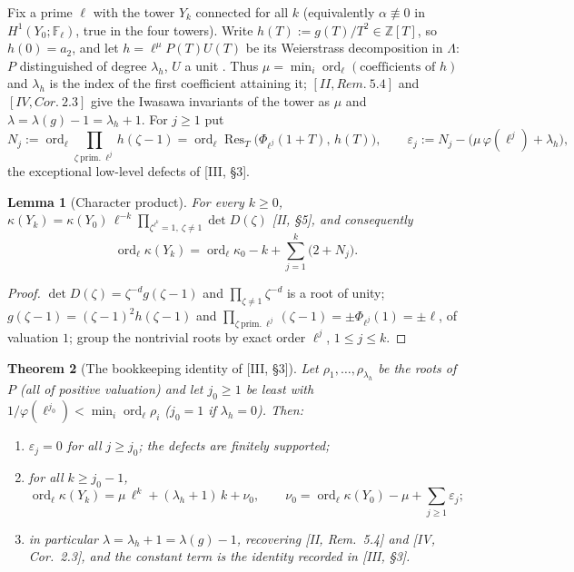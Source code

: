 \documentclass[11pt]{amsart}
\numberwithin{equation}{section}
\newtheorem{theorem}{Theorem}[section]
\newtheorem{lemma}[theorem]{Lemma}
\theoremstyle{definition}
\theoremstyle{remark}
\newcommand{\Z}{\mathbb{Z}}
\newcommand{\F}{\mathbb{F}}
\newcommand{\La}{\Lambda}
\newcommand{\ord}{\operatorname{ord}}
\newcommand{\Res}{\operatorname{Res}}
\begin{document}
Fix a prime $\ell$ with the tower $Y_k$ connected for all $k$ (equivalently
$\alpha\not\equiv0$ in $H^{1}(Y_0;\F_\ell)$, true in the four towers). Write
$h(T):=g(T)/T^{2}\in\Z[T]$, so $h(0)=a_2$, and let $h=\ell^{\mu}P(T)U(T)$ be its
Weierstrass decomposition in $\La$: $P$ distinguished of degree $\lambda_h$, $U$ a unit
\cite{Wa}. Thus $\mu=\min_i\ord_\ell(\text{coefficients of }h)$ and $\lambda_h$ is the
index of the first coefficient attaining it; $[II, Rem.~5.4]$ and $[IV, Cor.~2.3]$ give
the Iwasawa invariants of the tower as $\mu$ and $\lambda=\lambda(g)-1=\lambda_h+1$.
For $j\ge1$ put
\[
N_j:=\ord_\ell\prod_{\zeta\ \mathrm{prim.}\ \ell^{j}}h(\zeta-1)
=\ord_\ell\Res_T\bigl(\Phi_{\ell^{j}}(1+T),\,h(T)\bigr),
\qquad
\varepsilon_j:=N_j-\bigl(\mu\,\varphi(\ell^{j})+\lambda_h\bigr),
\]
the exceptional low-level defects of [III, \S3].

\begin{lemma}[Character product]\label{lem:char}
For every $k\ge0$,
$\kappa(Y_k)=\kappa(Y_0)\,\ell^{-k}\prod_{\zeta^{\ell^{k}}=1,\ \zeta\neq1}\det D(\zeta)$
{\rm[II, \S5]}, and consequently
\[
\ord_\ell\kappa(Y_k)=\ord_\ell\kappa_0-k+\sum_{j=1}^{k}\bigl(2+N_j\bigr).
\]
\end{lemma}

\begin{proof}
$\det D(\zeta)=\zeta^{-d}g(\zeta-1)$ and $\prod_{\zeta\neq1}\zeta^{-d}$ is a root of
unity; $g(\zeta-1)=(\zeta-1)^{2}h(\zeta-1)$ and
$\prod_{\zeta\ \mathrm{prim.}\ \ell^{j}}(\zeta-1)=\pm\Phi_{\ell^{j}}(1)=\pm\ell$, of
valuation $1$; group the nontrivial roots by exact order $\ell^{j}$, $1\le j\le k$.
\end{proof}

\begin{theorem}[The bookkeeping identity of {\rm[III, \S3]}]\label{thm:book}
Let $\rho_1,\dots,\rho_{\lambda_h}$ be the roots of $P$ (all of positive valuation) and
let $j_0\ge1$ be least with $1/\varphi(\ell^{j_0})<\min_i\ord_\ell\rho_i$ ($j_0=1$ if
$\lambda_h=0$). Then:
\begin{enumerate}
\item[(i)] $\varepsilon_j=0$ for all $j\ge j_0$; the defects are finitely supported;
\item[(ii)] for all $k\ge j_0-1$,
\[
\ord_\ell\kappa(Y_k)=\mu\,\ell^{k}+(\lambda_h+1)\,k+\nu_0,\qquad
\nu_0=\ord_\ell\kappa(Y_0)-\mu+\sum_{j\ge1}\varepsilon_j ;
\]
\item[(iii)] in particular $\lambda=\lambda_h+1=\lambda(g)-1$, recovering
{\rm[II, Rem.~5.4]} and {\rm[IV, Cor.~2.3]}, and the constant term is the identity
recorded in {\rm[III, \S3]}.
\end{enumerate}
\end{theorem}
\end{document}
